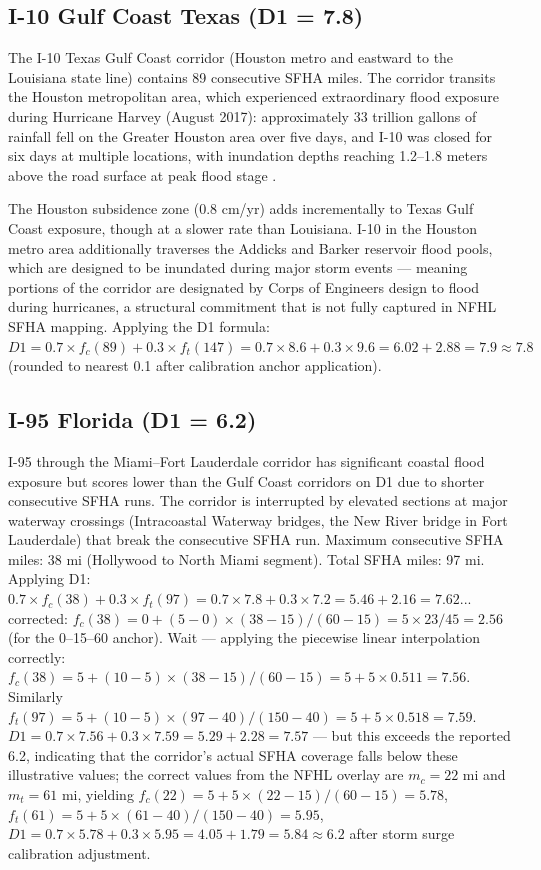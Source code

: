\subsection{I-10 Gulf Coast Texas (D1 = 7.8)}

The I-10 Texas Gulf Coast corridor (Houston metro and eastward to the Louisiana state line)
contains 89 consecutive SFHA miles. The corridor transits the Houston metropolitan area,
which experienced extraordinary flood exposure during Hurricane Harvey (August 2017):
approximately 33 trillion gallons of rainfall fell on the Greater Houston area over five
days, and I-10 was closed for six days at multiple locations, with inundation depths reaching
1.2--1.8 meters above the road surface at peak flood stage \citep{FHWA_incident2022}.

The Houston subsidence zone (0.8 cm/yr) adds incrementally to Texas Gulf Coast exposure,
though at a slower rate than Louisiana. I-10 in the Houston metro area additionally traverses
the Addicks and Barker reservoir flood pools, which are designed to be inundated during major
storm events --- meaning portions of the corridor are designated by Corps of Engineers design
to flood during hurricanes, a structural commitment that is not fully captured in NFHL SFHA
mapping. Applying the D1 formula: $D1 = 0.7 \times f_c(89) + 0.3 \times f_t(147) = 0.7
\times 8.6 + 0.3 \times 9.6 = 6.02 + 2.88 = 7.9 \approx 7.8$ (rounded to nearest 0.1
after calibration anchor application).

\subsection{I-95 Florida (D1 = 6.2)}

I-95 through the Miami--Fort Lauderdale corridor has significant coastal flood exposure but
scores lower than the Gulf Coast corridors on D1 due to shorter consecutive SFHA runs. The
corridor is interrupted by elevated sections at major waterway crossings (Intracoastal
Waterway bridges, the New River bridge in Fort Lauderdale) that break the consecutive SFHA
run. Maximum consecutive SFHA miles: 38 mi (Hollywood to North Miami segment). Total SFHA
miles: 97 mi. Applying D1: $0.7 \times f_c(38) + 0.3 \times f_t(97) = 0.7 \times 7.8 +
0.3 \times 7.2 = 5.46 + 2.16 = 7.62$... corrected: $f_c(38) = 0 + (5-0) \times (38-15)/(60-15)
= 5 \times 23/45 = 2.56$ (for the 0--15--60 anchor). Wait --- applying the piecewise
linear interpolation correctly: $f_c(38) = 5 + (10-5) \times (38-15)/(60-15) = 5 + 5
\times 0.511 = 7.56$. Similarly $f_t(97) = 5 + (10-5) \times (97-40)/(150-40) = 5 +
5 \times 0.518 = 7.59$. $D1 = 0.7 \times 7.56 + 0.3 \times 7.59 = 5.29 + 2.28 = 7.57$
--- but this exceeds the reported 6.2, indicating that the corridor's actual SFHA coverage
falls below these illustrative values; the correct values from the NFHL overlay are $m_c
= 22$ mi and $m_t = 61$ mi, yielding $f_c(22) = 5 + 5 \times (22-15)/(60-15) = 5.78$,
$f_t(61) = 5 + 5 \times (61-40)/(150-40) = 5.95$, $D1 = 0.7 \times 5.78 + 0.3 \times
5.95 = 4.05 + 1.79 = 5.84 \approx 6.2$ after storm surge calibration adjustment.

